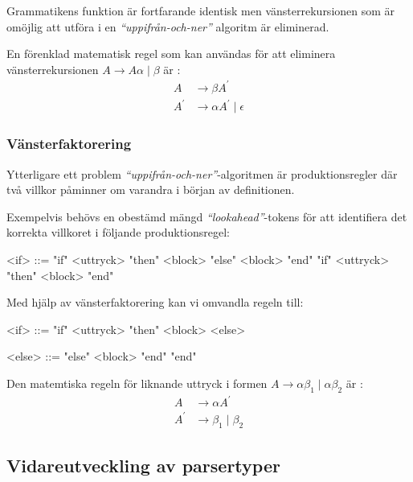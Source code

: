 Grammatikens funktion är fortfarande identisk men vänsterrekursionen som är
omöjlig att utföra i en \textit{``uppifrån-och-ner''} algoritm är eliminerad.

En förenklad matematisk regel som kan användas för att eliminera
vänsterrekursionen $A \rightarrow A\alpha\;|\;\beta$ är \citep[s. 212]{aa06}:
\begin{align*}
A &\rightarrow \beta A^\prime \\
A^\prime &\rightarrow \alpha A^\prime\;|\;\epsilon
\end{align*}

\subsubsection{Vänsterfaktorering}

Ytterligare ett problem \textit{``uppifrån-och-ner''}-algoritmen är
produktionsregler där två villkor påminner om varandra i början av
definitionen.

Exempelvis behövs en obestämd mängd \textit{``lookahead''}-tokens för att
identifiera det korrekta villkoret i följande produktionsregel:

\setlength{\grammarindent}{5em}
\begin{grammar}
  \singlespace\small%
  \selectfont
  <if> ::= "if" <uttryck> "then" <block> "else" <block> "end"
    \alt "if" <uttryck> "then" <block> "end"
\end{grammar}

Med hjälp av vänsterfaktorering kan vi omvandla regeln till:

\setlength{\grammarindent}{5em}
\begin{grammar}
  \singlespace\small%
  \selectfont
  <if> ::= "if" <uttryck> "then" <block> <else>

  <else> ::= "else" <block> "end"
    \alt "end"
\end{grammar}


Den matemtiska regeln för liknande uttryck i formen $A \rightarrow
\alpha\beta_1\;|\;\alpha\beta_2 $ är \citep[s. 214]{aa06}:
\begin{align*}
A &\rightarrow \alpha A^\prime \\
A^\prime &\rightarrow \beta_1\;|\;\beta_2
\end{align*}

\subsection{Vidareutveckling av parsertyper}

